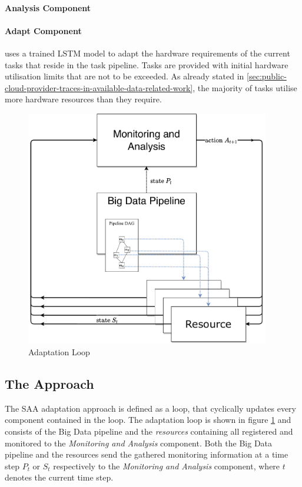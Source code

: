       \paragraph{Analysis Component } 
      
      \paragraph{Adapt Component } uses a trained LSTM model to adapt the hardware requirements of the current tasks that reside in the task pipeline.
      Tasks are provided with initial hardware utilisation limits that are not to be exceeded. As already stated in \ref{sec:public-cloud-provider-traces-in-available-data-related-work}, the majority of tasks utilise more hardware resources than they require.

  \begin{figure}[h!]
      \centering
      \includegraphics[width=0.95\textwidth]{figures/monitoring_with_inner_resources.drawio.pdf}
      \caption{Adaptation Loop}
      \label{fig:adaptation-loop}
  \end{figure}

  \subsection{The Approach}

  The SAA adaptation approach is defined as a loop, that cyclically updates every component contained in the loop.
  The adaptation loop is shown in figure \ref{fig:adaptation-loop} and consists of the Big Data pipeline and the \emph{resources} containing all registered and monitored to the \emph{Monitoring and Analysis} component. 
  Both the Big Data pipeline and the resources send the gathered monitoring information at a time step $P_t$ or $S_t$ respectively to the \emph{Monitoring and Analysis} component, where $t$ denotes the current time step.

